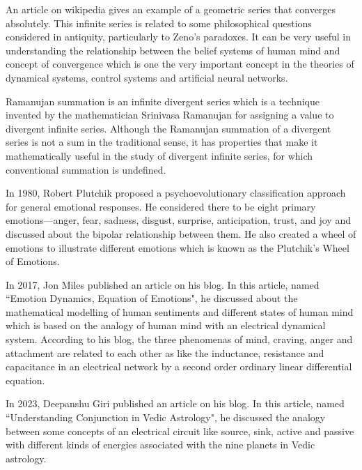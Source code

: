 An article on wikipedia gives an example of a geometric series that converges absolutely. This infinite series is related to some philosophical questions considered in antiquity, particularly to Zeno's paradoxes. It can be very useful in understanding the relationship between the belief systems of human mind and concept of convergence which is one the very important concept in the theories of dynamical systems, control systems and artificial neural networks\cite{enwiki:1123380424}.
\vspace{1\baselineskip}

Ramanujan summation is an infinite divergent series which is a technique invented by the mathematician Srinivasa Ramanujan for assigning a value to divergent infinite series. Although the Ramanujan summation of a divergent series is not a sum in the traditional sense, it has properties that make it mathematically useful in the study of divergent infinite series, for which conventional summation is undefined\cite{enwiki:1148245424}.
\vspace{1\baselineskip}

In 1980, Robert Plutchik proposed a psychoevolutionary classification approach for general emotional responses. He considered there to be eight primary emotions—anger, fear, sadness, disgust, surprise, anticipation, trust, and joy and discussed about the bipolar relationship between them. He also created a wheel of emotions to illustrate different emotions which is known as the Plutchik's Wheel of Emotions\cite{enwiki:1136521972}.
\vspace{1\baselineskip}

In 2017, Jon Miles published an article on his blog. In this article, named ``Emotion Dynamics, Equation of Emotions", he discussed about the mathematical modelling of human sentiments and different states of human mind which is based on the analogy of human mind with an electrical dynamical system. According to his blog, the three phenomenas of mind, craving, anger and attachment are related to each other as like the inductance, resistance and capacitance in an electrical network by a second order ordinary linear differential equation\cite{milesresearch}.
\vspace{1\baselineskip}

In 2023, Deepanshu Giri published an article on his blog. In this article, named ``Understanding Conjunction in Vedic Astrology", he discussed the analogy between some concepts of an electrical circuit like source, sink, active and passive with different kinds of energies associated with the nine planets in Vedic astrology\cite{DeepanshuGiriBlog}.